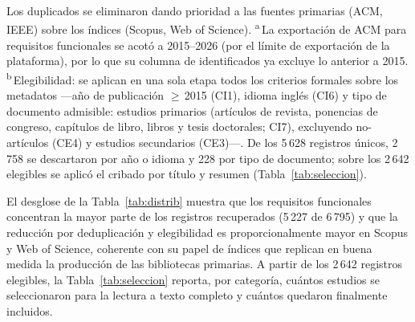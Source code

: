\documentclass[10pt,journal,twoside,letterpaper]{IEEEtran}
\begin{document}
\begin{table}[!tb]
        {\footnotesize Los duplicados se eliminaron dando prioridad a las fuentes primarias (ACM, IEEE) sobre los índices (Scopus, Web of Science). \textsuperscript{a}\,La exportación de ACM para requisitos funcionales se acotó a 2015--2026 (por el límite de exportación de la plataforma), por lo que su columna de identificados ya excluye lo anterior a 2015. \textsuperscript{b}\,Elegibilidad: se aplican en una sola etapa todos los criterios formales sobre los metadatos ---año de publicación $\geq$\,2015 (CI1), idioma inglés (CI6) y tipo de documento admisible: estudios primarios (artículos de revista, ponencias de congreso, capítulos de libro, libros y tesis doctorales; CI7), excluyendo no-artículos (CE4) y estudios secundarios (CE3)---. De los 5\,628 registros únicos, 2\,758 se descartaron por año o idioma y 228 por tipo de documento; sobre los 2\,642 elegibles se aplicó el cribado por título y resumen (Tabla~\ref{tab:seleccion}).}
    \end{table}
    
    El desglose de la Tabla~\ref{tab:distrib} muestra que los requisitos funcionales concentran la mayor parte de los registros recuperados (5\,227 de 6\,795) y que la reducción por deduplicación y elegibilidad es proporcionalmente mayor en Scopus y Web of Science, coherente con su papel de índices que replican en buena medida la producción de las bibliotecas primarias. A partir de los 2\,642 registros elegibles, la Tabla~\ref{tab:seleccion} reporta, por categoría, cuántos estudios se seleccionaron para la lectura a texto completo y cuántos quedaron finalmente incluidos.
    
\end{document}
